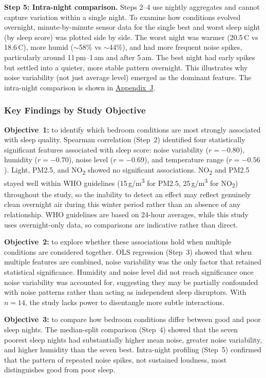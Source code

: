 \documentclass[10pt,a4paper]{extarticle}
\begin{document}
\textbf{Step 5: Intra-night comparison.} Steps 2--4 use nightly aggregates and cannot capture variation within a single night. To examine how conditions evolved overnight, minute-by-minute sensor data for the single best and worst sleep night (by sleep score) was plotted side by side. The worst night was warmer (20.5\,\textdegree C vs 18.6\,\textdegree C), more humid ($\sim$58\% vs $\sim$44\%), and had more frequent noise spikes, particularly around 11\,pm--1\,am and after 5\,am. The best night had early spikes but settled into a quieter, more stable pattern overnight. This illustrates why noise variability (not just average level) emerged as the dominant feature. The intra-night comparison is shown in \hyperref[app:J]{Appendix~J}.

\subsubsection{Key Findings by Study Objective}

\textbf{Objective~1:} to identify which bedroom conditions are most strongly associated with sleep quality. Spearman correlation (Step~2) identified four statistically significant features associated with sleep score: noise variability ($r = -0.80$), humidity ($r = -0.70$), noise level ($r = -0.69$), and temperature range ($r = -0.56$). Light, PM2.5, and NO\textsubscript{2} showed no significant associations. NO\textsubscript{2} and PM2.5 stayed well within WHO guidelines (15\,\textmu g/m\textsuperscript{3} for PM2.5, 25\,\textmu g/m\textsuperscript{3} for NO\textsubscript{2}) throughout the study, so the inability to detect an effect may reflect genuinely clean overnight air during this winter period rather than an absence of any relationship. WHO guidelines are based on 24-hour averages, while this study uses overnight-only data, so comparisons are indicative rather than direct.

\textbf{Objective~2:} to explore whether these associations hold when multiple conditions are considered together. OLS regression (Step~3) showed that when multiple features are combined, noise variability was the only factor that retained statistical significance. Humidity and noise level did not reach significance once noise variability was accounted for, suggesting they may be partially confounded with noise patterns rather than acting as independent sleep disruptors. With $n = 14$, the study lacks power to disentangle more subtle interactions.

\textbf{Objective~3:} to compare how bedroom conditions differ between good and poor sleep nights. The median-split comparison (Step~4) showed that the seven poorest sleep nights had substantially higher mean noise, greater noise variability, and higher humidity than the seven best. Intra-night profiling (Step~5) confirmed that the pattern of repeated noise spikes, not sustained loudness, most distinguishes good from poor sleep.
\end{document}
